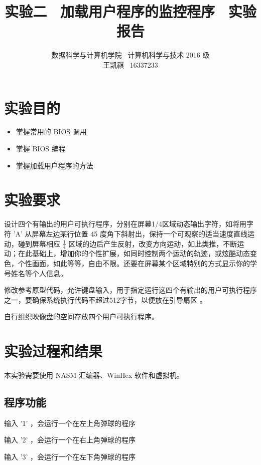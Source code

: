 \documentclass{article}
\begin{document}
\title{实验二 \ 加载用户程序的监控程序 \ 实验报告}
\author {数据科学与计算机学院 \ 计算机科学与技术 2016 级 \\ 王凯祺 \ 16337233}
\maketitle

\section{实验目的}

\begin{itemize}
\item 掌握常用的 BIOS 调用
\item 掌握 BIOS 编程
\item 掌握加载用户程序的方法
\end{itemize}

\section{实验要求}

设计四个有输出的用户可执行程序，分别在屏幕1/4区域动态输出字符，如将用字符 'A' 从屏幕左边某行位置 45 度角下斜射出，保持一个可观察的适当速度直线运动，碰到屏幕相应 $\frac{1}{4}$ 区域的边后产生反射，改变方向运动，如此类推，不断运动；在此基础上，增加你的个性扩展，如同时控制两个运动的轨迹，或炫酷动态变色，个性画面，如此等等，自由不限。还要在屏幕某个区域特别的方式显示你的学号姓名等个人信息。

修改参考原型代码，允许键盘输入，用于指定运行这四个有输出的用户可执行程序之一，要确保系统执行代码不超过512字节，以便放在引导扇区 。

自行组织映像盘的空间存放四个用户可执行程序。

\section{实验过程和结果}

本实验需要使用 NASM 汇编器、WinHex 软件和虚拟机。

\subsection{程序功能}

输入 '1' ，会运行一个在左上角弹球的程序

输入 '2' ，会运行一个在右上角弹球的程序

输入 '3' ，会运行一个在左下角弹球的程序
\end{document}

